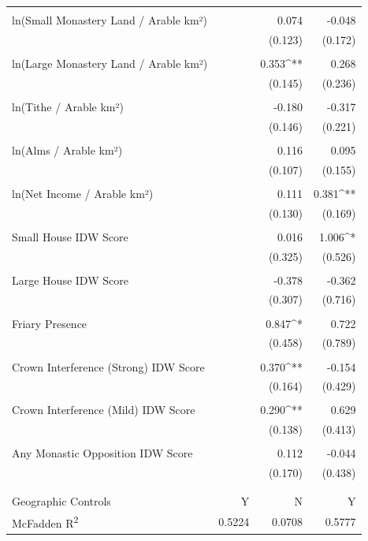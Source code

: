 \begin{table}[H]
\begin{tabular}{@{\extracolsep{.5pt}}lD{.}{.}{-3} D{.}{.}{-3} D{.}{.}{-3} }
  & & & \\ 
 ln(Small Monastery Land / Arable km²) &  & 0.074 & -0.048 \\ 
  &  & (0.123) & (0.172) \\ 
  & & & \\ 
 ln(Large Monastery Land / Arable km²) &  & 0.353^{**} & 0.268 \\ 
  &  & (0.145) & (0.236) \\ 
  & & & \\ 
 ln(Tithe / Arable km²) &  & -0.180 & -0.317 \\ 
  &  & (0.146) & (0.221) \\ 
  & & & \\ 
 ln(Alms / Arable km²) &  & 0.116 & 0.095 \\ 
  &  & (0.107) & (0.155) \\ 
  & & & \\ 
 ln(Net Income / Arable km²) &  & 0.111 & 0.381^{**} \\ 
  &  & (0.130) & (0.169) \\ 
  & & & \\ 
 Small House IDW Score &  & 0.016 & 1.006^{*} \\ 
  &  & (0.325) & (0.526) \\ 
  & & & \\ 
 Large House IDW Score &  & -0.378 & -0.362 \\ 
  &  & (0.307) & (0.716) \\ 
  & & & \\ 
 Friary Presence &  & 0.847^{*} & 0.722 \\ 
  &  & (0.458) & (0.789) \\ 
  & & & \\ 
 Crown Interference (Strong) IDW Score &  & 0.370^{**} & -0.154 \\ 
  &  & (0.164) & (0.429) \\ 
  & & & \\ 
 Crown Interference (Mild) IDW Score &  & 0.290^{**} & 0.629 \\ 
  &  & (0.138) & (0.413) \\ 
  & & & \\ 
 Any Monastic Opposition IDW Score &  & 0.112 & -0.044 \\ 
  &  & (0.170) & (0.438) \\ 
  & & & \\ 
\hline \\[-1.8ex] 
Geographic Controls & Y & N & Y \\ 
McFadden R\textsuperscript{2} & 0.5224 & 0.0708 & 0.5777 \\ 

\end{tabular}
\end{table}
